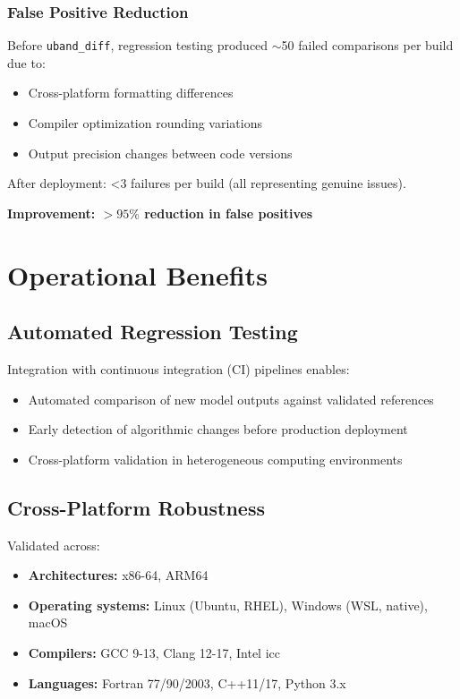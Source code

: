 \documentclass[11pt,letterpaper]{article}
\newcommand{\ubdiff}{\texttt{uband\_diff}}
\begin{document}
\subsubsection{False Positive Reduction}

Before \ubdiff{}, regression testing produced $\sim$50 failed comparisons per build due to:
\begin{itemize}
    \item Cross-platform formatting differences
    \item Compiler optimization rounding variations
    \item Output precision changes between code versions
\end{itemize}

After deployment: <3 failures per build (all representing genuine issues).

\textbf{Improvement: $>95\%$ reduction in false positives}

\section{Operational Benefits}
\label{sec:benefits}

\subsection{Automated Regression Testing}

Integration with continuous integration (CI) pipelines enables:
\begin{itemize}
    \item Automated comparison of new model outputs against validated references
    \item Early detection of algorithmic changes before production deployment
    \item Cross-platform validation in heterogeneous computing environments
\end{itemize}

\subsection{Cross-Platform Robustness}

Validated across:
\begin{itemize}
    \item \textbf{Architectures:} x86-64, ARM64
    \item \textbf{Operating systems:} Linux (Ubuntu, RHEL), Windows (WSL, native), macOS
    \item \textbf{Compilers:} GCC 9-13, Clang 12-17, Intel icc
    \item \textbf{Languages:} Fortran 77/90/2003, C++11/17, Python 3.x
\end{itemize}
\end{document}
